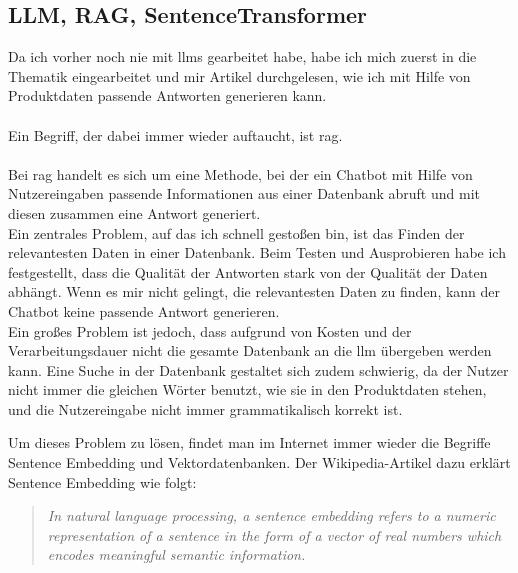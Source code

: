 \subsection{LLM, RAG, SentenceTransformer}\label{sec:umsetzung_intro}
Da ich vorher noch nie mit \gls{llm}s gearbeitet habe, habe ich mich zuerst in die Thematik eingearbeitet  
und mir Artikel durchgelesen, wie ich mit Hilfe von Produktdaten passende Antworten generieren kann.\\\\  
Ein Begriff, der dabei immer wieder auftaucht, ist \gls{rag}.\\\\  
Bei \gls{rag} handelt es sich um eine Methode, bei der ein Chatbot mit Hilfe von Nutzereingaben passende  
Informationen aus einer Datenbank abruft und mit diesen zusammen eine Antwort generiert.\\  
Ein zentrales Problem, auf das ich schnell gestoßen bin, ist das Finden der relevantesten Daten in einer Datenbank.  
Beim Testen und Ausprobieren habe ich festgestellt, dass die Qualität der Antworten stark von der Qualität der Daten abhängt.  
Wenn es mir nicht gelingt, die relevantesten Daten zu finden, kann der Chatbot keine passende Antwort generieren.\\  
Ein großes Problem ist jedoch, dass aufgrund von Kosten und der Verarbeitungsdauer nicht die gesamte Datenbank an die \gls{llm} übergeben werden kann.  
Eine Suche in der Datenbank gestaltet sich zudem schwierig, da der Nutzer nicht immer die gleichen Wörter benutzt, wie sie in den Produktdaten stehen, und  
die Nutzereingabe nicht immer grammatikalisch korrekt ist.

\pagebreak
Um dieses Problem zu lösen, findet man im Internet immer wieder die Begriffe Sentence Embedding und Vektordatenbanken.  
Der Wikipedia-Artikel dazu erklärt Sentence Embedding wie folgt:\\  
\cite{wiki:SentEmb}
\begin{quote}
    \textit{In natural language processing, a sentence embedding refers to a numeric representation of a sentence in the form of a vector of real numbers which encodes meaningful semantic information.}
\end{quote}\\

